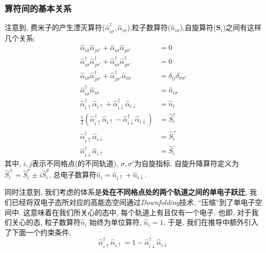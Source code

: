 \documentclass[a4paper, 12pt]{article}
\begin{document}
\subsubsection{算符间的基本关系}
注意到, 费米子的产生湮灭算符(\(\widehat{\alpha}^\dagger_{i\sigma}, \widehat{\alpha}_{i\sigma}\)),粒子数算符(\(\widehat{n}_{i\sigma}\)),自旋算符(\(\bm{S}_i\))之间有这样几个关系:
\begin{subequations}
  \label{eq:confine-1}
  \begin{align}
    \widehat{\alpha}_{i\sigma}\widehat{\alpha}_{j\sigma'} + \widehat{\alpha}_{i\sigma}\widehat{\alpha}_{j\sigma'} &= 0\\
    \widehat{\alpha}^\dagger_{i\sigma}\widehat{\alpha}^\dagger_{j\sigma'} + \widehat{\alpha}^\dagger_{i\sigma}\widehat{\alpha}^\dagger_{j\sigma'} &= 0\\
    \widehat{\alpha}_{i\sigma}\widehat{\alpha}^\dagger_{j\sigma'} + \widehat{\alpha}^\dagger_{j\sigma'}\widehat{\alpha}_{i\sigma} &= \delta_{ij}\delta_{\sigma\sigma'}\\
    \widehat{\alpha}^\dagger_{i\sigma}\widehat{\alpha}_{i\sigma} &= \widehat{n}_{i\sigma}\\
    \widehat{\alpha}^\dagger_{i\uparrow}\widehat{\alpha}_{i\uparrow} + \widehat{\alpha}^\dagger_{i\downarrow}\widehat{\alpha}_{i\downarrow} &= \widehat{n}_{i}\\
    \frac{1}{2}(\widehat{\alpha}^\dagger_{i\uparrow}\widehat{\alpha}_{i\uparrow} - \widehat{\alpha}^\dagger_{i\downarrow}\widehat{\alpha}_{i\downarrow}) &= \widehat{S}_i^z\\
    \widehat{\alpha}^\dagger_{i\uparrow}\widehat{\alpha}_{i\downarrow} &= \widehat{S}_i^+\\
    \widehat{\alpha}^\dagger_{i\downarrow}\widehat{\alpha}_{i\uparrow} &= \widehat{S}_i^-
  \end{align}
\end{subequations}
其中, \(i,j\)表示不同格点(的不同轨道), \(\sigma, \sigma'\)为自旋指标. 自旋升降算符定义为\(\widehat{S}_i^\pm = \widehat{S}_i^x \pm i\widehat{S}_i^y\), 总电子数算符\(\widehat{n}_{i} = \widehat{n}_{i\uparrow} + \widehat{n}_{i\downarrow}\).

同时注意到, 我们考虑的体系是\textbf{处在不同格点处的两个轨道之间的单电子跃迁}, 我们已经将双电子态所对应的高能态空间通过\emph{Downfolding}技术, ``压缩''到了单电子空间中. 这意味着在我们所关心的态中, 每个轨道上有且仅有一个电子. 也即, 对于我们关心的态, 粒子数算符\(\widehat{n}_{i}\) 始终为单位算符, \(\widehat{n}_{i} = 1\). 于是, 我们在推导中额外引入了下面一个约束条件,
\begin{equation}
  \label{eq:confine-0.9}
  \widehat{\alpha}^\dagger_{i\uparrow}\widehat{\alpha}_{i\uparrow} = 1 - \widehat{\alpha}^\dagger_{i\downarrow}\widehat{\alpha}_{i\downarrow}
\end{equation}
\end{document}
